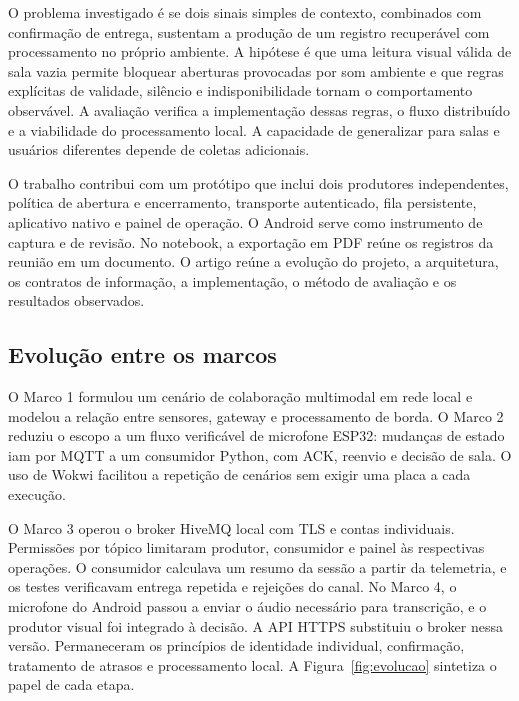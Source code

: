 \documentclass[12pt]{article}
\begin{document}
O problema investigado é se dois sinais simples de contexto, combinados com confirmação de entrega, sustentam a produção de um registro recuperável com processamento no próprio ambiente. A hipótese é que uma leitura visual válida de sala vazia permite bloquear aberturas provocadas por som ambiente e que regras explícitas de validade, silêncio e indisponibilidade tornam o comportamento observável. A avaliação verifica a implementação dessas regras, o fluxo distribuído e a viabilidade do processamento local. A capacidade de generalizar para salas e usuários diferentes depende de coletas adicionais.

O trabalho contribui com um protótipo que inclui dois produtores independentes, política de abertura e encerramento, transporte autenticado, fila persistente, aplicativo nativo e painel de operação. O Android serve como instrumento de captura e de revisão. No notebook, a exportação em PDF reúne os registros da reunião em um documento. O artigo reúne a evolução do projeto, a arquitetura, os contratos de informação, a implementação, o método de avaliação e os resultados observados.

\subsection{Evolução entre os marcos}

O Marco 1 formulou um cenário de colaboração multimodal em rede local e modelou a relação entre sensores, gateway e processamento de borda. O Marco 2 reduziu o escopo a um fluxo verificável de microfone ESP32: mudanças de estado iam por MQTT a um consumidor Python, com ACK, reenvio e decisão de sala. O uso de Wokwi facilitou a repetição de cenários sem exigir uma placa a cada execução.

O Marco 3 operou o broker HiveMQ local com TLS e contas individuais. Permissões por tópico limitaram produtor, consumidor e painel às respectivas operações. O consumidor calculava um resumo da sessão a partir da telemetria, e os testes verificavam entrega repetida e rejeições do canal. No Marco 4, o microfone do Android passou a enviar o áudio necessário para transcrição, e o produtor visual foi integrado à decisão. A API HTTPS substituiu o broker nessa versão. Permaneceram os princípios de identidade individual, confirmação, tratamento de atrasos e processamento local. A Figura~\ref{fig:evolucao} sintetiza o papel de cada etapa.
\end{document}
